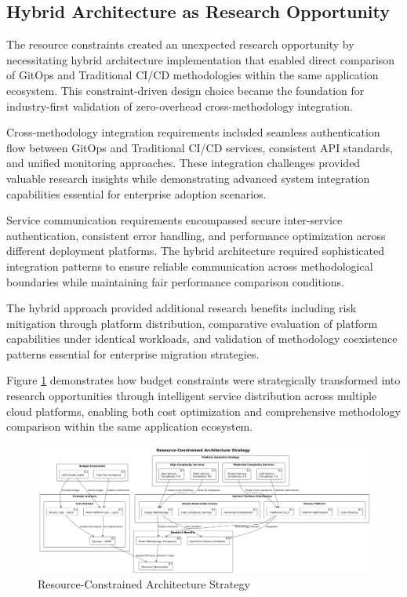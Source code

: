 
\subsection{Hybrid Architecture as Research Opportunity}

The resource constraints created an unexpected research opportunity by necessitating hybrid architecture implementation that enabled direct comparison of GitOps and Traditional CI/CD methodologies within the same application ecosystem. This constraint-driven design choice became the foundation for industry-first validation of zero-overhead cross-methodology integration.

Cross-methodology integration requirements included seamless authentication flow between GitOps and Traditional CI/CD services, consistent API standards, and unified monitoring approaches. These integration challenges provided valuable research insights while demonstrating advanced system integration capabilities essential for enterprise adoption scenarios.

Service communication requirements encompassed secure inter-service authentication, consistent error handling, and performance optimization across different deployment platforms. The hybrid architecture required sophisticated integration patterns to ensure reliable communication across methodological boundaries while maintaining fair performance comparison conditions.


The hybrid approach provided additional research benefits including risk mitigation through platform distribution, comparative evaluation of platform capabilities under identical workloads, and validation of methodology coexistence patterns essential for enterprise migration strategies.

Figure \ref{fig:resource-constrained-architecture} demonstrates how budget constraints were strategically transformed into research opportunities through intelligent service distribution across multiple cloud platforms, enabling both cost optimization and comprehensive methodology comparison within the same application ecosystem.

\begin{figure}[H]
\centering
\includegraphics[width=1.0\textwidth]{figures/Resource-Constrained-Architecture-Strategy.png}
\caption{Resource-Constrained Architecture Strategy}
\label{fig:resource-constrained-architecture}
\end{figure}

